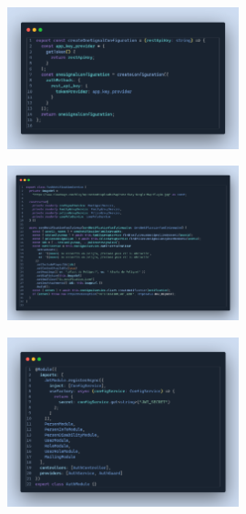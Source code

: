 \label{apendix:configuracion-onesignal-api}
\begin{figure}[H]
    \centering
    \includegraphics[width=0.6\textwidth]{chapters/appendices/code/configuracion-onesignal-api.png}
\end{figure}


\label{apendix:envio-notificaciones-api}
\begin{figure}[H]
    \centering
    \includegraphics[width=0.6\textwidth]{chapters/appendices/code/envio-notificaciones-api.png}
\end{figure}


\label{apendix:modulos-api}
\begin{figure}[H]
    \centering
    \includegraphics[width=0.6\textwidth]{chapters/appendices/code/modulos-api.png}
\end{figure}


